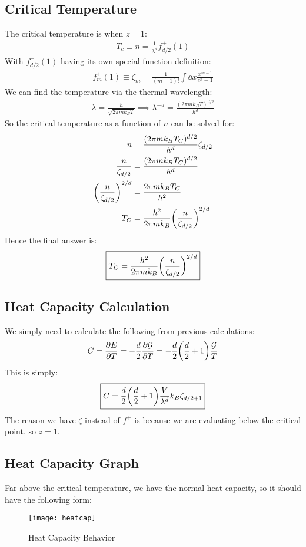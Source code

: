 \documentclass[12pt]{article}
\begin{document}
\subsection{Critical Temperature}
The critical temperature is when $z=1$:
\begin{align*}
  T_c\equiv n=\frac{1}{\lambda^d}f^+_{d/2}(1)
\end{align*}
With $f^+_{d/2}(1)$ having its own special function definition:
\begin{align*}
  f^+_{m}(1)\equiv\zeta_{m}=\frac{1}{(m-1)!}\int\dd{x}\frac{x^{m-1}}{e^x-1}
\end{align*}
We can find the temperature via the thermal wavelength:
\begin{align*}
  \lambda=\frac{h}{\sqrt{2\pi mk_BT}}\implies \lambda^{-d}=
  \frac{(2\pi mk_BT)^{d/2}}{h^d}
\end{align*}
So the critical temperature as a function of $n$ can be solved for:
\begin{align*}
  n&=\frac{(2\pi mk_BT_C)^{d/2}}{h^d}\zeta_{d/2}\\
  \frac{n}{\zeta_{d/2}}&=\frac{(2\pi mk_BT_C)^{d/2}}{h^d}\\
  \qty(\frac{n}{\zeta_{d/2}})^{2/d}&=\frac{2\pi mk_BT_C}{h^2}\\
  T_C&=\frac{h^2}{2\pi mk_B}\qty(\frac{n}{\zeta_{d/2}})^{2/d}
\end{align*}
Hence the final answer is:
\begin{align}
  \boxed{T_C=\frac{h^2}{2\pi mk_B}\qty(\frac{n}{\zeta_{d/2}})^{2/d}}
\end{align}

\subsection{Heat Capacity Calculation}
We simply need to calculate the following from previous calculations:
\begin{align*}
  C=\pdv{E}{T}=-\frac{d}{2}\pdv{\mathcal{G}}{T}=
  -\frac{d}{2}\qty(\frac{d}{2}+1)\frac{\mathcal{G}}{T}
\end{align*}
This is simply:
\begin{align}
  \boxed{C=\frac{d}{2}\qty(\frac{d}{2}+1)\frac{V}{\lambda^d}k_B\zeta_{d/2+1}}
\end{align}
The reason we have $\zeta$ instead of $f^+$ is because we are evaluating below the critical point, so $z=1$.

\subsection{Heat Capacity Graph}
Far above the critical temperature, we have the normal heat capacity, so it should have the following form:
\begin{figure}[H]
  \centering
  \texttt{[image: heatcap]}
  \caption{Heat Capacity Behavior}
\end{figure}
\end{document}
